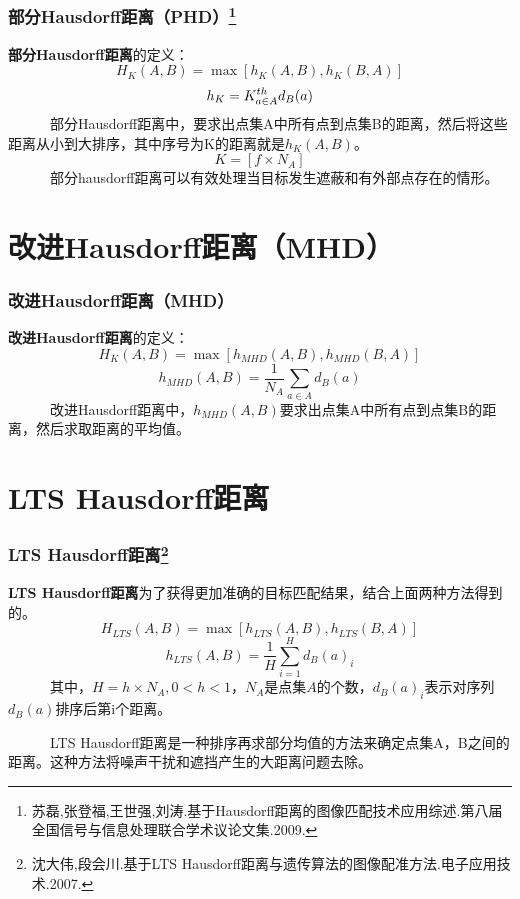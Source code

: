 \documentclass[notheorems,mathserif,table,compress]{beamer}  %
\begin{document}
\begin{frame}
\frametitle{部分Hausdorff距离（PHD）\footnote{苏磊,张登福,王世强,刘涛.基于Hausdorff距离的图像匹配技术应用综述.第八届全国信号与信息处理联合学术议论文集.2009.}}
{\color{blue}\textbf{部分Hausdorff距离}}的定义：
\begin{displaymath}
H_{K}(A,B)=\max[h_{K}(A,B),h_{K}(B,A)]
\end{displaymath}
\begin{displaymath}
h_{K}=K^{th}_{\begin{subarray}{l}
              a\in A
               \end{subarray}}
d_{B}(a)
\end{displaymath}
~~~~~~部分Hausdorff距离中，要求出点集A中所有点到点集B的距离，然后将这些距离从小到大排序，其中序号为K的距离就是$h_{K}(A,B)$。
\begin{displaymath}
K=[f\times N_{A}]
\end{displaymath}
~~~~~~部分hausdorff距离可以有效处理当目标发生遮蔽和有外部点存在的情形。
\end{frame}

\section{改进Hausdorff距离（MHD）}   
 
\begin{frame}
\frametitle{改进Hausdorff距离（MHD）}
{\color{blue}\textbf{改进Hausdorff距离}}的定义：
\begin{displaymath}
H_{K}(A,B)=\max[h_{MHD}(A,B),h_{MHD}(B,A)]
\end{displaymath}
\begin{displaymath}
h_{MHD}(A,B)=\frac{1}{N_{A}}\sum_{a\in A} d_{B}(a)
\end{displaymath}
~~~~~~改进Hausdorff距离中，$h_{MHD}(A,B)$要求出点集A中所有点到点集B的距离，然后求取距离的平均值。
\end{frame}      

\section{LTS Hausdorff距离} 
\begin{frame}
\frametitle{LTS Hausdorff距离\footnote{沈大伟,段会川.基于LTS Hausdorff距离与遗传算法的图像配准方法.电子应用技术.2007.}}
{\color{blue}\textbf{LTS Hausdorff距离}}为了获得更加准确的目标匹配结果，结合上面两种方法得到的。
\begin{displaymath}
H_{LTS}(A,B)=\max[h_{LTS}(A,B),h_{LTS}(B,A)]
\end{displaymath}
\begin{displaymath}
h_{LTS}(A,B)=\frac{1}{H}\sum_{i=1}^{H} d_{B}(a)_{i}
\end{displaymath}
~~~~~~其中，$H=h\times N_{A},0<h<1$，$N_{A}$是点集$A$的个数，$d_{B}(a)_{i}$表示对序列$d_{B}(a)$排序后第i个距离。

~~~~~~LTS Hausdorff距离是一种排序再求部分均值的方法来确定点集A，B之间的距离。这种方法将噪声干扰和遮挡产生的大距离问题去除。
\end{frame}
\end{document}
